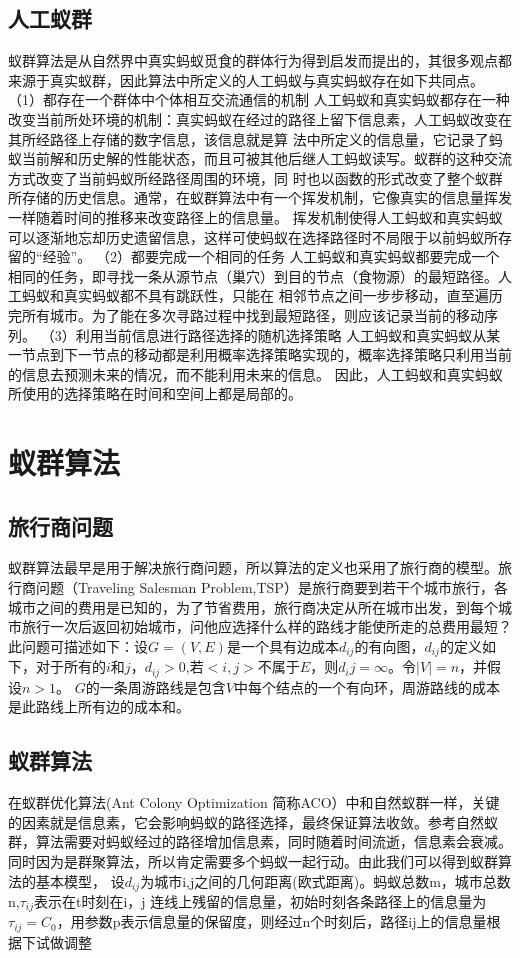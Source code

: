 \documentclass[12pt,nofonts]{ctexart}
\begin{document}
\subsection{人工蚁群}
蚁群算法\cite{ref1}是从自然界中真实蚂蚁觅食的群体行为得到启发而提出的，其很多观点都来源于真实蚁群，因此算法中所定义的人工蚂蚁与真实蚂蚁存在如下共同点。
  （1）都存在一个群体中个体相互交流通信的机制
   人工蚂蚁和真实蚂蚁都存在一种改变当前所处环境的机制：真实蚂蚁在经过的路径上留下信息素，人工蚂蚁改变在其所经路径上存储的数字信息，该信息就是算
法中所定义的信息量，它记录了蚂蚁当前解和历史解的性能状态，而且可被其他后继人工蚂蚁读写。蚁群的这种交流方式改变了当前蚂蚁所经路径周围的环境，同
时也以函数的形式改变了整个蚁群所存储的历史信息。通常，在蚁群算法中有一个挥发机制，它像真实的信息量挥发一样随着时间的推移来改变路径上的信息量。
挥发机制使得人工蚂蚁和真实蚂蚁可以逐渐地忘却历史遗留信息，这样可使蚂蚁在选择路径时不局限于以前蚂蚁所存留的“经验”。
   （2）都要完成一个相同的任务
   人工蚂蚁和真实蚂蚁都要完成一个相同的任务，即寻找一条从源节点（巢穴）到目的节点（食物源）的最短路径。人工蚂蚁和真实蚂蚁都不具有跳跃性，只能在
相邻节点之间一步步移动，直至遍历完所有城市。为了能在多次寻路过程中找到最短路径，则应该记录当前的移动序列。
   （3）利用当前信息进行路径选择的随机选择策略
   人工蚂蚁和真实蚂蚁从某一节点到下一节点的移动都是利用概率选择策略实现的，概率选择策略只利用当前的信息去预测未来的情况，而不能利用未来的信息。
因此，人工蚂蚁和真实蚂蚁所使用的选择策略在时间和空间上都是局部的。
\section{蚁群算法}
\subsection{旅行商问题}
蚁群算法最早是用于解决旅行商问题，所以算法的定义也采用了旅行商的模型。旅行商问题（Traveling Salesman Problem,TSP）是旅行商要到若干个城市旅行，各城市之间的费用是已知的，为了节省费用，旅行商决定从所在城市出发，到每个城市旅行一次后返回初始城市，问他应选择什么样的路线才能使所走的总费用最短？此问题可描述如下：设$G=(V,E)$是一个具有边成本$d_{ij}$的有向图，$d_{ij}$的定义如下，对于所有的$i$和$j$，$d_{ij}>0$,若$<i,j>$不属于$E$，则$d_ij=∞$。令$|V|=n$，并假设$n>1$。 $G$的一条周游路线是包含$V$中每个结点的一个有向环，周游路线的成本是此路线上所有边的成本和。
\subsection{蚁群算法}
在蚁群优化算法(Ant Colony Optimization 简称ACO）\cite{ref2}中和自然蚁群一样，关键的因素就是信息素，它会影响蚂蚁的路径选择，最终保证算法收敛。参考自然蚁群，算法需要对蚂蚁经过的路径增加信息素，同时随着时间流逝，信息素会衰减。同时因为是群聚算法，所以肯定需要多个蚂蚁一起行动。由此我们可以得到蚁群算法的基本模型，
设$d_{ij}$为城市i,j之间的几何距离(欧式距离)。蚂蚁总数m，城市总数n,$\tau_{ij}$表示在t时刻在i，j
	连线上残留的信息量，初始时刻各条路径上的信息量为$\tau_{ij}=C_0$，用参数p表示信息量的保留度，则经过n个时刻后，路径ij上的信息量根据下试做调整
\end{document}
